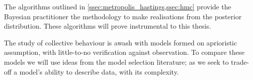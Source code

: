 The algorithms outlined in \cref{ssec:metropolis_hastings,ssec:hmc} provide the
Bayesian practitioner the methodology to make realisations from the posterior
distribution. These algorithms will prove instrumental to this thesis.

The study of collective behaviour is awash with models formed on aprioristic
assumption, with little-to-no verification against observation. To compare
these models we will use ideas from the model selection literature; as we seek
to trade-off a model's ability to describe data, with its complexity.
